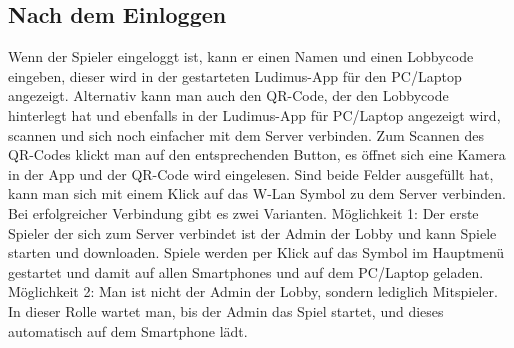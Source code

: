 \subsection{Nach dem Einloggen}
Wenn der Spieler eingeloggt ist, kann er einen Namen und einen Lobbycode eingeben, dieser wird in der gestarteten Ludimus-App für den PC/Laptop angezeigt. Alternativ kann man auch den QR-Code, der den Lobbycode hinterlegt hat und ebenfalls in der Ludimus-App für PC/Laptop angezeigt wird, scannen und sich noch einfacher mit dem Server verbinden. Zum Scannen des QR-Codes klickt man auf den entsprechenden Button, es öffnet sich eine Kamera in der App und der QR-Code wird eingelesen. Sind beide Felder ausgefüllt hat, kann man sich mit einem Klick auf das W-Lan Symbol zu dem Server verbinden. Bei erfolgreicher Verbindung gibt es zwei Varianten. Möglichkeit 1: Der erste Spieler der sich zum Server verbindet ist der Admin der Lobby und kann Spiele starten und downloaden. Spiele werden per Klick auf das Symbol im Hauptmenü gestartet und damit auf allen Smartphones und auf dem PC/Laptop geladen. Möglichkeit 2: 
Man ist nicht der Admin der Lobby, sondern lediglich Mitspieler. In dieser Rolle wartet man, bis der Admin das Spiel startet, und dieses automatisch auf dem Smartphone lädt.
